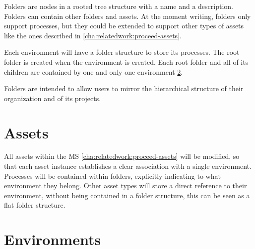 Folders are nodes in a rooted tree structure with a name and a description.
Folders can contain other folders and assets.
At the moment writing, folders only support processes, but they could be extended to
support other types of assets like the ones described in \ref{cha:relatedwork:proceed-assets}.

Each environment will have a folder structure to store its processes.
The root folder is created when the environment is created.
Each root folder and all of its children are contained by one and only one environment \ref{cha:conceptanddesign:environments}.

Folders are intended to allow users to mirror the hierarchical structure of their
organization and of its projects.




\section{Assets}

All assets within the MS \ref{cha:relatedwork:proceed-assets}
will be modified, so that each asset instance establishes a clear association with a single environment.
Processes will be contained within folders, explicitly indicating to what environment they
belong.
Other asset types will store a direct reference to their environment, without being
contained in a folder structure, this can be seen as a flat folder structure.



\section{Environments}
\label{cha:conceptanddesign:environments}

